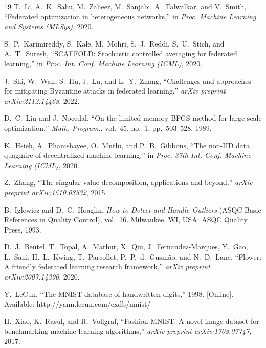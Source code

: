 \documentclass[journal]{IEEEtran}
\begin{document}
\begin{thebibliography}{19}
T.~Li, A.~K.~Sahu, M.~Zaheer, M.~Sanjabi, A.~Talwalkar, and V.~Smith, ``Federated optimization in heterogeneous networks,'' in \textit{Proc. Machine Learning and Systems (MLSys)}, 2020.

S.~P.~Karimireddy, S.~Kale, M.~Mohri, S.~J.~Reddi, S.~U.~Stich, and A.~T.~Suresh, ``SCAFFOLD: Stochastic controlled averaging for federated learning,'' in \textit{Proc. Int. Conf. Machine Learning (ICML)}, 2020.

J.~Shi, W.~Wan, S.~Hu, J.~Lu, and L.~Y.~Zhang, ``Challenges and approaches for mitigating Byzantine attacks in federated learning,'' \textit{arXiv preprint arXiv:2112.14468}, 2022.

D.~C.~Liu and J.~Nocedal, ``On the limited memory BFGS method for large scale optimization,'' \textit{Math. Program.}, vol.~45, no.~1, pp.~503--528, 1989.

K.~Hsieh, A.~Phanishayee, O.~Mutlu, and P.~B.~Gibbons, ``The non-IID data quagmire of decentralized machine learning,'' in \textit{Proc. 37th Int. Conf. Machine Learning (ICML)}, 2020.

Z.~Zhang, ``The singular value decomposition, applications and beyond,'' \textit{arXiv preprint arXiv:1510.08532}, 2015.

B.~Iglewicz and D.~C.~Hoaglin, \textit{How to Detect and Handle Outliers} (ASQC Basic References in Quality Control), vol.~16.\hskip 1sp Milwaukee, WI, USA: ASQC Quality Press, 1993.

D.~J.~Beutel, T.~Topal, A.~Mathur, X.~Qiu, J.~Fernandez-Marques, Y.~Gao, L.~Sani, H.~L.~Kwing, T.~Parcollet, P.~P.~d.~Gusm\~{a}o, and N.~D.~Lane, ``Flower: A friendly federated learning research framework,'' \textit{arXiv preprint arXiv:2007.14390}, 2020.

Y.~LeCun, ``The MNIST database of handwritten digits,'' 1998. [Online]. Available: http://yann.lecun.com/exdb/mnist/

H.~Xiao, K.~Rasul, and R.~Vollgraf, ``Fashion-MNIST: A novel image dataset for benchmarking machine learning algorithms,'' \textit{arXiv preprint arXiv:1708.07747}, 2017.

\end{thebibliography}
\end{document}
